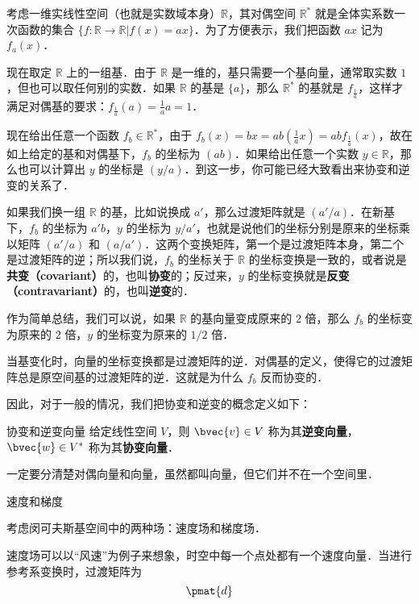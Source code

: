\begin{example}{}
考虑一维实线性空间（也就是实数域本身）$\mathbb{R}$，其对偶空间 $\mathbb{R}^*$ 就是全体实系数一次函数的集合 $\{f:\mathbb{R}\rightarrow\mathbb{R}|f(x)=ax\}$．为了方便表示，我们把函数 $ax$ 记为 $f_a(x)$．

现在取定 $\mathbb{R}$ 上的一组基．由于 $\mathbb{R}$ 是一维的，基只需要一个基向量，通常取实数 $1$，但也可以取任何别的实数．如果 $\mathbb{R}$ 的基是 $\{a\}$，那么 $\mathbb{R}^*$ 的基就是 $f_{\frac{1}{a}}$，这样才满足对偶基的要求：$f_{\frac{1}{a}}(a)=\frac{1}{a}a=1$．

现在给出任意一个函数 $f_b\in\mathbb{R}^*$，由于 $f_b(x)=bx=ab(\frac{1}{a}x)=abf_{\frac{1}{a}}(x)$，故在如上给定的基和对偶基下，$f_b$ 的坐标为 $(ab)$．如果给出任意一个实数 $y\in\mathbb{R}$，那么也可以计算出 $y$ 的坐标是 $(y/a)$．到这一步，你可能已经大致看出来协变和逆变的关系了．

如果我们换一组 $\mathbb{R}$ 的基，比如说换成 $a'$，那么过渡矩阵就是 $(a'/a)$．在新基下，$f_b$ 的坐标为 $a'b$，$y$ 的坐标为 $y/a'$，也就是说他们的坐标分别是原来的坐标乘以矩阵 $(a'/a)$ 和 $(a/a')$．这两个变换矩阵，第一个是过渡矩阵本身，第二个是过渡矩阵的逆；所以我们说，$f_b$ 的坐标关于 $\mathbb{R}$ 的坐标变换是一致的，或者说是\textbf{共变（covariant）}的，也叫\textbf{协变}的；反过来，$y$ 的坐标变换就是\textbf{反变（contravariant）}的，也叫\textbf{逆变}的．

作为简单总结，我们可以说，如果 $\mathbb{R}$ 的基向量变成原来的 $2$ 倍，那么 $f_b$ 的坐标变为原来的 $2$ 倍，$y$ 的坐标变为原来的 $1/2$ 倍．
\end{example}

当基变化时，向量的坐标变换都是过渡矩阵的逆．对偶基的定义，使得它的过渡矩阵总是原空间基的过渡矩阵的逆．这就是为什么 $f_b$ 反而协变的．

因此，对于一般的情况，我们把协变和逆变的概念定义如下：

\begin{definition}{协变和逆变向量}
给定线性空间 $V$，则 $\bvec{v}\in V$ 称为其\textbf{逆变向量}，$\bvec{w}\in V^*$ 称为其\textbf{协变向量}．
\end{definition}

一定要分清楚对偶向量和向量，虽然都叫向量，但它们并不在一个空间里．


\begin{example}{速度和梯度}

考虑闵可夫斯基空间中的两种场：速度场和梯度场．

速度场可以以“风速”为例子来想象，时空中每一个点处都有一个速度向量．当进行参考系变换时，过渡矩阵为
\begin{equation}
\pmat{
    d
}
\end{equation}

\end{example}




